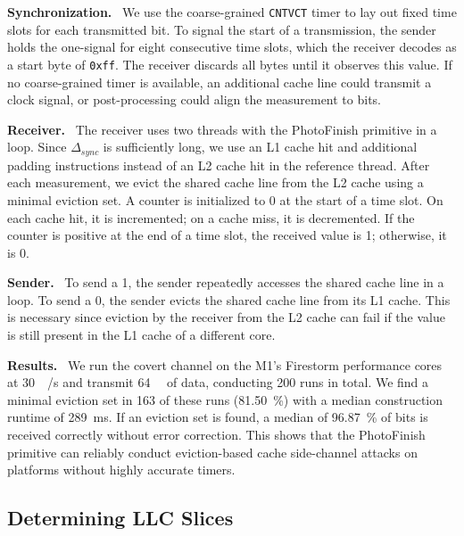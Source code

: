 \documentclass[letterpaper,twocolumn,10pt]{article} %
\newcommand{\code}[1]{\texttt{#1}\xspace}
\newcommand{\paragrabf}[1]{\noindent \textbf{#1.}\ }
\newcommand{\AttackName}{PhotoFinish\xspace}
\newcommand{\rdelta}[1]{$\Delta_{#1}$}
\begin{document}
\paragrabf{Synchronization}
We use the coarse-grained \texttt{CNTVCT} timer to lay out fixed time slots for each transmitted bit.
To signal the start of a transmission, the sender holds the one-signal for eight consecutive time slots, which the receiver decodes as a start byte of \code{0xff}. The receiver discards all bytes until it observes this value.
If no coarse-grained timer is available, an additional cache line could transmit a clock signal, or post-processing could align the measurement to bits.

\paragrabf{Receiver}
The receiver uses two threads with the \AttackName primitive in a loop.
Since \rdelta{sync} is sufficiently long, we use an L1 cache hit and additional padding instructions instead of an L2 cache hit in the reference thread.
After each measurement, we evict the shared cache line from the L2 cache using a minimal eviction set.
A counter is initialized to 0 at the start of a time slot.
On each cache hit, it is incremented; on a cache miss, it is decremented.
If the counter is positive at the end of a time slot, the received value is 1; otherwise, it is 0.

\paragrabf{Sender}
To send a 1, the sender repeatedly accesses the shared cache line in a loop.
To send a 0, the sender evicts the shared cache line from its L1 cache.
This is necessary since eviction by the receiver from the L2 cache can fail if the value is still present in the L1 cache of a different core.

\paragrabf{Results}
We run the covert channel on the M1's Firestorm performance cores at \SI{30}{\kilo\byte/\second} and transmit \SI{64}{\kilo\byte} of data, conducting \num{200} runs in total.
We find a minimal eviction set in \num{163} of these runs (\SI{81.50}{\percent}) with a median construction runtime of \SI{289}{\milli\second}.
If an eviction set is found, a median of \SI{96.87}{\percent} of bits is received correctly without error correction.
This shows that the \AttackName primitive can reliably conduct eviction-based cache side-channel attacks on platforms without highly accurate timers.

\subsection{Determining LLC Slices}\label{subsec:determining-llc-slices}
\end{document}

